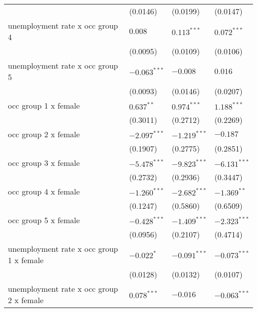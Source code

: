 \begin{tabular}{llll}
                                         &           (0.0146) &           (0.0199) &           (0.0147) \\
unemployment rate x occ group 4          &            $0.008$ &      $0.113^{***}$ &      $0.072^{***}$ \\
                                         &           (0.0095) &           (0.0109) &           (0.0106) \\
unemployment rate x occ group 5          &     $-0.063^{***}$ &           $-0.008$ &            $0.016$ \\
                                         &           (0.0093) &           (0.0146) &           (0.0207) \\
occ group 1 x female                     &       $0.637^{**}$ &      $0.974^{***}$ &      $1.188^{***}$ \\
                                         &           (0.3011) &           (0.2712) &           (0.2269) \\
occ group 2 x female                     &     $-2.097^{***}$ &     $-1.219^{***}$ &           $-0.187$ \\
                                         &           (0.1907) &           (0.2775) &           (0.2851) \\
occ group 3 x female                     &     $-5.478^{***}$ &     $-9.823^{***}$ &     $-6.131^{***}$ \\
                                         &           (0.2732) &           (0.2936) &           (0.3447) \\
occ group 4 x female                     &     $-1.260^{***}$ &     $-2.682^{***}$ &      $-1.369^{**}$ \\
                                         &           (0.1247) &           (0.5860) &           (0.6509) \\
occ group 5 x female                     &     $-0.428^{***}$ &     $-1.409^{***}$ &     $-2.323^{***}$ \\
                                         &           (0.0956) &           (0.2107) &           (0.4714) \\
unemployment rate x occ group 1 x female &         $-0.022^*$ &     $-0.091^{***}$ &     $-0.073^{***}$ \\
                                         &           (0.0128) &           (0.0132) &           (0.0107) \\
unemployment rate x occ group 2 x female &      $0.078^{***}$ &           $-0.016$ &     $-0.063^{***}$ \\

\end{tabular}
